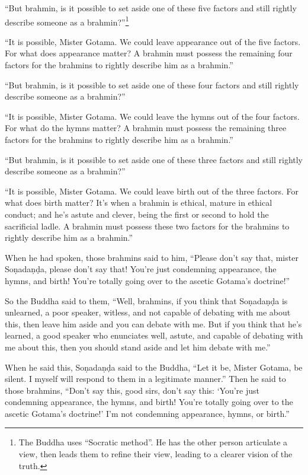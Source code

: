 \documentclass[12pt,openany]{book}%
\begin{document}
“But brahmin, is it possible to set aside one of these five factors and still rightly describe someone as a brahmin?”\footnote{The Buddha uses “Socratic method”. He has the other person articulate a view, then leads them to refine their view, leading to a clearer vision of the truth. } 

“It is possible, Mister Gotama. We could leave appearance out of the five factors. For what does appearance matter? A brahmin must possess the remaining four factors for the brahmins to rightly describe him as a brahmin.” 

“But brahmin, is it possible to set aside one of these four factors and still rightly describe someone as a brahmin?” 

“It is possible, Mister Gotama. We could leave the hymns out of the four factors. For what do the hymns matter? A brahmin must possess the remaining three factors for the brahmins to rightly describe him as a brahmin.” 

“But brahmin, is it possible to set aside one of these three factors and still rightly describe someone as a brahmin?” 

“It is possible, Mister Gotama. We could leave birth out of the three factors. For what does birth matter? It’s when a brahmin is ethical, mature in ethical conduct; and he’s astute and clever, being the first or second to hold the sacrificial ladle. A brahmin must possess these two factors for the brahmins to rightly describe him as a brahmin.” 

When he had spoken, those brahmins said to him, “Please don’t say that, mister \textsanskrit{Soṇadaṇḍa}, please don’t say that! You’re just condemning appearance, the hymns, and birth! You’re totally going over to the ascetic Gotama’s doctrine!” 

So the Buddha said to them, “Well, brahmins, if you think that \textsanskrit{Soṇadaṇḍa} is unlearned, a poor speaker, witless, and not capable of debating with me about this, then leave him aside and you can debate with me. But if you think that he’s learned, a good speaker who enunciates well, astute, and capable of debating with me about this, then you should stand aside and let him debate with me.” 

When he said this, \textsanskrit{Soṇadaṇḍa} said to the Buddha, “Let it be, Mister Gotama, be silent. I myself will respond to them in a legitimate manner.” Then he said to those brahmins, “Don’t say this, good sirs, don’t say this: ‘You’re just condemning appearance, the hymns, and birth! You’re totally going over to the ascetic Gotama’s doctrine!’ I’m not condemning appearance, hymns, or birth.” 
\end{document}
